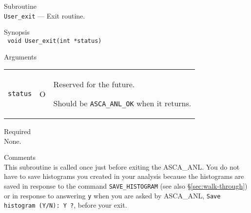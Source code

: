 \newpage
\begin{description}
\item{Subroutine}\\
   {\tt User\_exit} --- Exit routine.
\item{Synopsis}\\
   {\tt
      void User\_exit(int *status)
   }
\item{Arguments} \\
 \begin{tabular}{l@{\ (}c@{)\ }p{}}
   {\tt status} & O & Reserved for the future.\par
                      Should be {\tt ASCA\_ANL\_OK} when it returns.
 \end{tabular}
\item{Required} \\
   None.
\item{Comments} \\
   This subroutine is called once
   just before exiting the ASCA\_ANL.
   You do not have to save histograms you created in your analysis
   because the histograms are saved in response to the command
   {\tt SAVE\_HISTOGRAM} (see also \S \ref{sec:walk-through})
   or in response to answering {\tt y} when you are asked by ASCA\_ANL,
   {\tt Save histogram (Y/N): Y ?}, before your exit.
\end{description}








